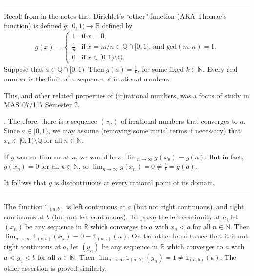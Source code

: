\documentclass[letterpaper,10pt,english]{jupyterBook}
\begin{document}
\bigskip\hrule\bigskip


\sphinxAtStartPar
{\hyperref[\detokenize{Problems:id22}]{}} Recall from  in the notes that Dirichlet’s “other” function (AKA Thomae’s function) is defined  \(g:[0, 1)\rightarrow \mathbb{R}\) defined by
\begin{equation*}
\begin{split}
g(x) =\begin{cases}
	1 &\text{if $x = 0$},\\
	\displaystyle\frac{1}{n}& \text{if $x = m/n \in \mathbb{Q}\cap[0,1)$, and $\text{gcd}(m,n)=1$.}\\
	0&\text{if $x \in [0,1)\setminus \mathbb{Q}$}.
\end{cases}
\end{split}
\end{equation*}
\sphinxAtStartPar
Suppose that \(a \in \mathbb{Q}\cap[0,1)\). Then \(g(a)=\frac{1}{k}\), for some fixed \(k\in\mathbb{N}\). Every real number is the limit of a sequence of irrational numbers%
\begin{footnote}[1]\sphinxAtStartFootnote
This, and other related properties of (ir)rational numbers, was a focus of study in MAS107/117 Semester 2.
%
\end{footnote}. Therefore, there is a sequence \((x_{n})\) of irrational numbers that converges to \(a\). Since \(a\in[0,1)\), we may assume (removing some initial terms if necessary) that \(x_n\in[0,1)\setminus\mathbb{Q}\) for all \(n\in\mathbb{N}\).

\sphinxAtStartPar
If \(g\) was continuous at \(a\), we would have \(\lim_{n\rightarrow\infty}g(x_n)=g(a)\). But in fact, \(g(x_n)=0\) for all \(n\in\mathbb{N}\), so \(\lim_{n\rightarrow\infty}g(x_n)=0\neq \frac{1}{k}=g(a)\).

\sphinxAtStartPar
It follows that \(g\) is discontinuous at every rational point of its domain.


\bigskip\hrule\bigskip


\sphinxAtStartPar
{\hyperref[\detokenize{Problems:id23}]{}}

The function \(\mathbb{1}_{(a, b)}\) is left continuous at \(a\) (but not right continuous), and right continuous at \(b\) (but not left continuous).
To prove the left continuity at \(a\), let \((x_{n})\) be any sequence in \(\mathbb{R}\) which converges to \(a\) with \(x_{n} < a\) for all \(n\in\mathbb{N}\). Then \(\lim_{n\rightarrow\infty} \mathbb{1}_{(a, b)}(x_{n}) = 0 = \mathbb{1}_{(a, b)}(a).\) On the other hand to see that it is not right continuous at \(a\), let \((y_{n})\) be any sequence in \(\mathbb{R}\) which converges to \(a\) with \(a < y_{n} < b\) for all \(n\in\mathbb{N}\). Then
\( \lim_{n\rightarrow\infty} \mathbb{1}_{(a, b)}(y_{n}) = 1 \neq \mathbb{1}_{(a, b)}(a). \) The other assertion is proved similarly.
\end{document}
